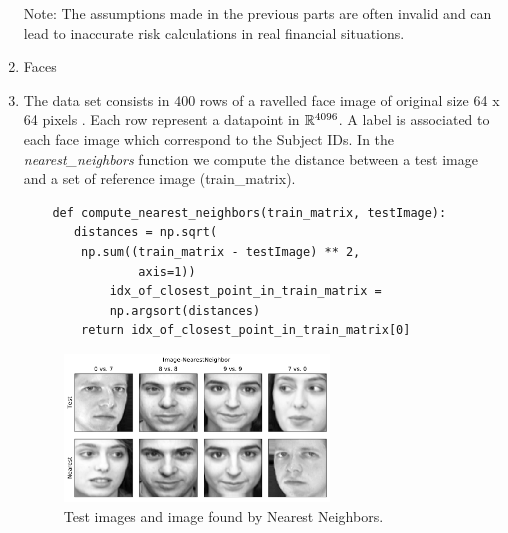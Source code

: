 \documentclass[12pt,twoside]{article}
\begin{document}
\begin{enumerate}
\begin{enumerate}
  \end{enumerate}
  Note: The assumptions made in the previous parts are often
  invalid and can lead to inaccurate risk calculations in real
  financial situations. 
  
  \newpage
  \item Faces
  	\bi
		\item 
		The data set consists in $400$ rows of a ravelled face image of original size 64 x 64 pixels . Each row represent a datapoint in $\mathbb{R}^{4096}$.
		A label is associated to each face image which correspond to the Subject IDs.
		In the \emph{nearest\_neighbors} function we compute the distance between a test image and a set of reference image (train\_matrix).

\begin{verbatim}
	def compute_nearest_neighbors(train_matrix, testImage):
	   distances = np.sqrt(
	   	np.sum((train_matrix - testImage) ** 2, 
	   			axis=1))
    	    idx_of_closest_point_in_train_matrix = 
	    	np.argsort(distances)
	    return idx_of_closest_point_in_train_matrix[0]
\end{verbatim}


	\begin{figure}[H]
		\centering
		\includegraphics[width=200pt]{figures/Image-NearestNeighbor}
		\caption{Test images and image found by Nearest Neighbors.}
		\label{fig5}
	\end{figure}


	\ei	
  
\end{enumerate}
\end{document}
